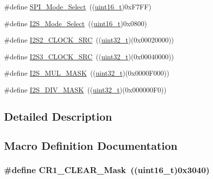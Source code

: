 \begin{DoxyCompactItemize}
\item 
\#define \hyperlink{group___s_p_i___private___defines_ga71da9dd90bf7bfb6ed1748a1e181677a}{S\+P\+I\+\_\+\+Mode\+\_\+\+Select}~((\hyperlink{_p_e___types_8h_a1f1825b69244eb3ad2c7165ddc99c956}{uint16\+\_\+t})0x\+F7\+F\+F)
\item 
\#define \hyperlink{group___s_p_i___private___defines_ga196b1b58421a7ee7dba0b46fb33c621b}{I2\+S\+\_\+\+Mode\+\_\+\+Select}~((\hyperlink{_p_e___types_8h_a1f1825b69244eb3ad2c7165ddc99c956}{uint16\+\_\+t})0x0800)
\item 
\#define \hyperlink{group___s_p_i___private___defines_gae1190efd6dbcd06a9c03f4d499d28e4c}{I2\+S2\+\_\+\+C\+L\+O\+C\+K\+\_\+\+S\+RC}~((\hyperlink{_p_e___types_8h_a33594304e786b158f3fb30289278f5af}{uint32\+\_\+t})(0x00020000))
\item 
\#define \hyperlink{group___s_p_i___private___defines_gabb67971448c15090f3372e3875db3d23}{I2\+S3\+\_\+\+C\+L\+O\+C\+K\+\_\+\+S\+RC}~((\hyperlink{_p_e___types_8h_a33594304e786b158f3fb30289278f5af}{uint32\+\_\+t})(0x00040000))
\item 
\#define \hyperlink{group___s_p_i___private___defines_gaf9cca755995c8e8f7a4012709ca468f2}{I2\+S\+\_\+\+M\+U\+L\+\_\+\+M\+A\+SK}~((\hyperlink{_p_e___types_8h_a33594304e786b158f3fb30289278f5af}{uint32\+\_\+t})(0x0000\+F000))
\item 
\#define \hyperlink{group___s_p_i___private___defines_ga26cdb43c45ac655c792c5af0a6bbb0bf}{I2\+S\+\_\+\+D\+I\+V\+\_\+\+M\+A\+SK}~((\hyperlink{_p_e___types_8h_a33594304e786b158f3fb30289278f5af}{uint32\+\_\+t})(0x000000\+F0))
\end{DoxyCompactItemize}


\subsection{Detailed Description}


\subsection{Macro Definition Documentation}
\subsubsection[{\texorpdfstring{C\+R1\+\_\+\+C\+L\+E\+A\+R\+\_\+\+Mask}{CR1_CLEAR_Mask}}]{\setlength{\rightskip}{0pt plus 5cm}\#define C\+R1\+\_\+\+C\+L\+E\+A\+R\+\_\+\+Mask~(({\bf uint16\+\_\+t})0x3040)}\hypertarget{group___s_p_i___private___defines_ga67f7dd35ea3d1296677e5fc50b88fa90}{}\label{group___s_p_i___private___defines_ga67f7dd35ea3d1296677e5fc50b88fa90}


